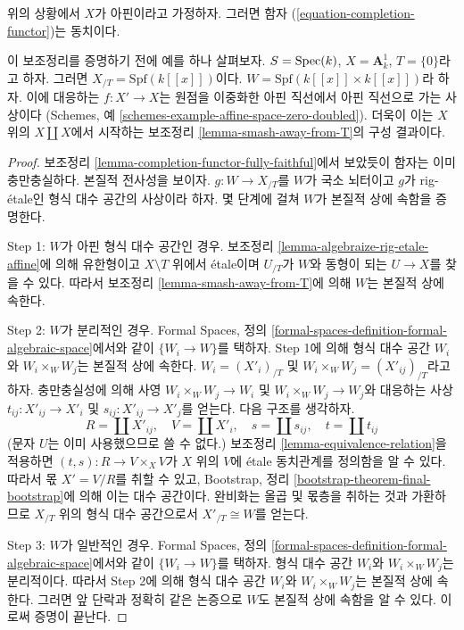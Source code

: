 \begin{lemma}
\label{lemma-dilatations-affine}
위의 상황에서 $X$가 아핀이라고 가정하자.
그러면 함자 (\ref{equation-completion-functor})는 동치이다.
\end{lemma}

\noindent
이 보조정리를 증명하기 전에 예를 하나 살펴보자.
$S = \mathop{\mathrm{Spec}}(k)$, $X = \mathbf{A}^1_k$, $T = \{0\}$라고 하자.
그러면 $X_{/T} = \text{Spf}(k[[x]])$이다.
$W = \text{Spf}(k[[x]] \times k[[x]])$라 하자.
이에 대응하는 $f : X' \to X$는 원점을 이중화한 아핀 직선에서
아핀 직선으로 가는 사상이다
(Schemes, 예 \ref{schemes-example-affine-space-zero-doubled}).
더욱이 이는 $X$ 위의 $X \amalg X$에서 시작하는
보조정리 \ref{lemma-smash-away-from-T}의 구성 결과이다.

\begin{proof}
보조정리 \ref{lemma-completion-functor-fully-faithful}에서 보았듯이
함자는 이미 충만충실하다. 본질적 전사성을 보이자.
$g : W \to X_{/T}$를 $W$가 국소 뇌터이고
$g$가 rig-\'etale인 형식 대수 공간의 사상이라 하자.
몇 단계에 걸쳐 $W$가 본질적 상에 속함을 증명한다.

\medskip\noindent
Step 1: $W$가 아핀 형식 대수 공간인 경우.
보조정리 \ref{lemma-algebraize-rig-etale-affine}에 의해
유한형이고 $X \setminus T$ 위에서 \'etale이며
$U_{/T}$가 $W$와 동형이 되는 $U \to X$를 찾을 수 있다.
따라서 보조정리 \ref{lemma-smash-away-from-T}에 의해
$W$는 본질적 상에 속한다.

\medskip\noindent
Step 2: $W$가 분리적인 경우.
Formal Spaces, 정의
\ref{formal-spaces-definition-formal-algebraic-space}에서와 같이
$\{W_i \to W\}$를 택하자. Step 1에 의해 형식 대수 공간
$W_i$와 $W_i \times_W W_j$는 본질적 상에 속한다.
$W_i = (X'_i)_{/T}$ 및
$W_i \times_W W_j = (X'_{ij})_{/T}$라고 하자.
충만충실성에 의해 사영
$W_i \times_W W_j \to W_i$ 및
$W_i \times_W W_j \to W_j$와 대응하는 사상
$t_{ij} : X'_{ij} \to X'_i$ 및
$s_{ij} : X'_{ij} \to X'_j$를 얻는다.
다음 구조를 생각하자.
$$
R = \coprod X'_{ij},\quad
V = \coprod X'_i,\quad
s = \coprod s_{ij},\quad
t = \coprod t_{ij}
$$
(문자 $U$는 이미 사용했으므로 쓸 수 없다.)
보조정리 \ref{lemma-equivalence-relation}을 적용하면
$(t, s) : R \to V \times_X V$가 $X$ 위의 $V$에
\'etale 동치관계를 정의함을 알 수 있다.
따라서 몫 $X' = V/R$를 취할 수 있고, Bootstrap, 정리
\ref{bootstrap-theorem-final-bootstrap}에 의해 이는 대수 공간이다.
완비화는 올곱 및 몫층을 취하는 것과 가환하므로
$X_{/T}$ 위의 형식 대수 공간으로서 $X'_{/T} \cong W$를 얻는다.

\medskip\noindent
Step 3: $W$가 일반적인 경우.
Formal Spaces, 정의
\ref{formal-spaces-definition-formal-algebraic-space}에서와 같이
$\{W_i \to W\}$를 택하자.
형식 대수 공간 $W_i$와 $W_i \times_W W_j$는 분리적이다.
따라서 Step 2에 의해 형식 대수 공간 $W_i$와
$W_i \times_W W_j$는 본질적 상에 속한다.
그러면 앞 단락과 정확히 같은 논증으로
$W$도 본질적 상에 속함을 알 수 있다.
이로써 증명이 끝난다.
\end{proof}

